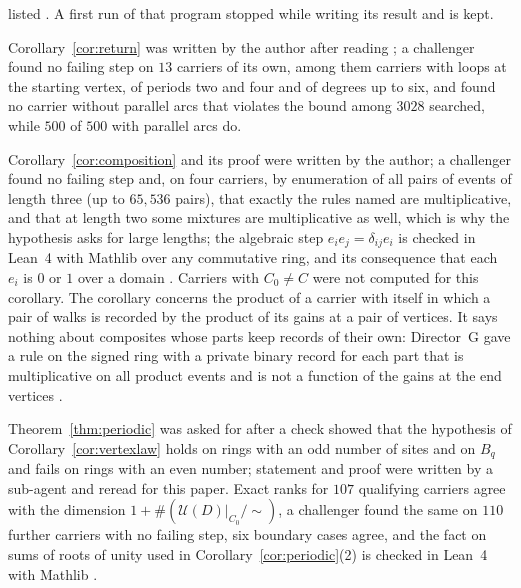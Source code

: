 listed \cite{comp4s}. A first run of that program stopped while writing its result and is kept.

Corollary~\ref{cor:return} was written by the author after reading \cite{dgret}; a challenger found no failing step on $13$ carriers of its own, among them carriers with loops at the starting vertex, of periods two and four and of degrees up to six, and found no carrier without parallel arcs that violates the bound among $3028$ searched, while $500$ of $500$ with parallel arcs do.

Corollary~\ref{cor:composition} and its proof were written by the author; a challenger found no failing step and, on four carriers, by enumeration of all pairs of events of length three (up to $65{,}536$ pairs), that exactly the rules named are multiplicative, and that at length two some mixtures are multiplicative as well, which is why the hypothesis asks for large lengths; the algebraic step $e_ie_j=\delta_{ij}e_i$ is checked in Lean~4 with Mathlib over any commutative ring, and its consequence that each $e_i$ is $0$ or $1$ over a domain \cite{comp4s}. Carriers with $C_0\ne C$ were not computed for this corollary. The corollary concerns the product of a carrier with itself in which a pair of walks is recorded by the product of its gains at a pair of vertices. It says nothing about composites whose parts keep records of their own: Director~G gave a rule on the signed ring with a private binary record for each part that is multiplicative on all product events and is not a function of the gains at the end vertices \cite{dgz1}.

Theorem~\ref{thm:periodic} was asked for after a check showed that the hypothesis of Corollary~\ref{cor:vertexlaw} holds on rings with an odd number of sites and on $B_q$ and fails on rings with an even number; statement and proof were written by a sub-agent and reread for this paper. Exact ranks for $107$ qualifying carriers agree with the dimension $1+\#(\mathcal{U}(D)|_{C_0}/\!\sim)$, a challenger found the same on $110$ further carriers with no failing step, six boundary cases agree, and the fact on sums of roots of unity used in Corollary~\ref{cor:periodic}(2) is checked in Lean~4 with Mathlib \cite{comp4s}.

